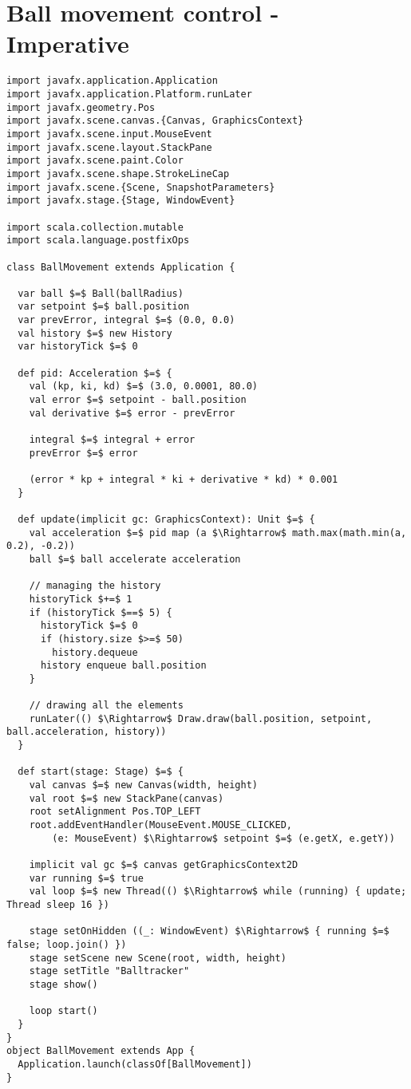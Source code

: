 \chapter{Ball movement control - Imperative}
\label{app:ball-movement}

\begin{lstlisting}[style=ScalaStyle, caption={Ball movement control}, label={lst:ball-full-app}]
import javafx.application.Application
import javafx.application.Platform.runLater
import javafx.geometry.Pos
import javafx.scene.canvas.{Canvas, GraphicsContext}
import javafx.scene.input.MouseEvent
import javafx.scene.layout.StackPane
import javafx.scene.paint.Color
import javafx.scene.shape.StrokeLineCap
import javafx.scene.{Scene, SnapshotParameters}
import javafx.stage.{Stage, WindowEvent}

import scala.collection.mutable
import scala.language.postfixOps

class BallMovement extends Application {

  var ball $=$ Ball(ballRadius)
  var setpoint $=$ ball.position
  var prevError, integral $=$ (0.0, 0.0)
  val history $=$ new History
  var historyTick $=$ 0

  def pid: Acceleration $=$ {
    val (kp, ki, kd) $=$ (3.0, 0.0001, 80.0)
    val error $=$ setpoint - ball.position
    val derivative $=$ error - prevError

    integral $=$ integral + error
    prevError $=$ error

    (error * kp + integral * ki + derivative * kd) * 0.001
  }

  def update(implicit gc: GraphicsContext): Unit $=$ {
    val acceleration $=$ pid map (a $\Rightarrow$ math.max(math.min(a, 0.2), -0.2))
    ball $=$ ball accelerate acceleration

    // managing the history
    historyTick $+=$ 1
    if (historyTick $==$ 5) {
      historyTick $=$ 0
      if (history.size $>=$ 50)
        history.dequeue
      history enqueue ball.position
    }

    // drawing all the elements
    runLater(() $\Rightarrow$ Draw.draw(ball.position, setpoint, ball.acceleration, history))
  }

  def start(stage: Stage) $=$ {
    val canvas $=$ new Canvas(width, height)
    val root $=$ new StackPane(canvas)
    root setAlignment Pos.TOP_LEFT
    root.addEventHandler(MouseEvent.MOUSE_CLICKED,
        (e: MouseEvent) $\Rightarrow$ setpoint $=$ (e.getX, e.getY))

    implicit val gc $=$ canvas getGraphicsContext2D
    var running $=$ true
    val loop $=$ new Thread(() $\Rightarrow$ while (running) { update; Thread sleep 16 })

    stage setOnHidden ((_: WindowEvent) $\Rightarrow$ { running $=$ false; loop.join() })
    stage setScene new Scene(root, width, height)
    stage setTitle "Balltracker"
    stage show()

    loop start()
  }
}
object BallMovement extends App {
  Application.launch(classOf[BallMovement])
}
\end{lstlisting}

